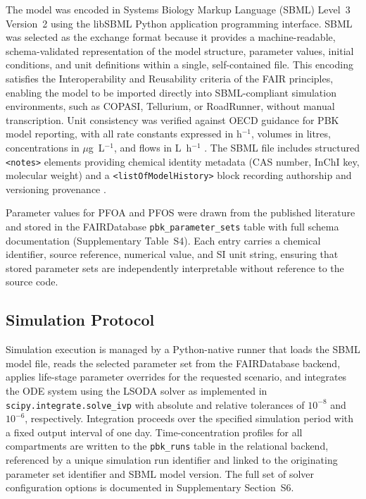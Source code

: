 \documentclass[preprint,12pt]{elsarticle}
\begin{document}
\begin{linenumbers}
The model was encoded in Systems Biology Markup Language (SBML) Level~3 Version~2 using the libSBML Python application programming interface. SBML was selected as the exchange format because it provides a machine-readable, schema-validated representation of the model structure, parameter values, initial conditions, and unit definitions within a single, self-contained file. This encoding satisfies the Interoperability and Reusability criteria of the FAIR principles, enabling the model to be imported directly into SBML-compliant simulation environments, such as COPASI, Tellurium, or RoadRunner, without manual transcription. Unit consistency was verified against OECD guidance for PBK model reporting, with all rate constants expressed in h$^{-1}$, volumes in litres, concentrations in $\mu$g~L$^{-1}$, and flows in L~h$^{-1}$ \citep{OECD2021}. The SBML file includes structured \texttt{<notes>} elements providing chemical identity metadata (CAS number, InChI key, molecular weight) and a \texttt{<listOfModelHistory>} block recording authorship and versioning provenance \citep{hucka2003}.

Parameter values for PFOA and PFOS were drawn from the published literature and stored in the FAIRDatabase \texttt{pbk\_parameter\_sets} table with full schema documentation (Supplementary Table~S4). Each entry carries a chemical identifier, source reference, numerical value, and SI unit string, ensuring that stored parameter sets are independently interpretable without reference to the source code.

\subsection{Simulation Protocol}\label{sec:simprotocol}

Simulation execution is managed by a Python-native runner that loads the SBML model file, reads the selected parameter set from the FAIRDatabase backend, applies life-stage parameter overrides for the requested scenario, and integrates the ODE system using the LSODA solver as implemented in \texttt{scipy.integrate.solve\_ivp} with absolute and relative tolerances of $10^{-8}$ and $10^{-6}$, respectively. Integration proceeds over the specified simulation period with a fixed output interval of one day. Time-concentration profiles for all compartments are written to the \texttt{pbk\_runs} table in the relational backend, referenced by a unique simulation run identifier and linked to the originating parameter set identifier and SBML model version. The full set of solver configuration options is documented in Supplementary Section~S6.

\end{linenumbers}
\end{document}
